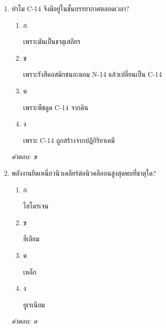 \documentclass[12pt]{article}
\begin{document}
\begin{enumerate}[label=\arabic*., itemsep=0.5\baselineskip, topsep=0.5\baselineskip, leftmargin=*]
\item ทำไม C-14 จึงมีอยู่ในชั้นบรรยากาศตลอดเวลา?
\begin{enumerate}[label=\alph*)., itemsep=0.3\baselineskip, topsep=0.3\baselineskip]
\item ก\ 
\begin{minipage}[t]{0.9\linewidth}
\raggedright เพราะมันเป็นธาตุเสถียร
\end{minipage}
\item ข\ 
\begin{minipage}[t]{0.9\linewidth}
\raggedright เพราะรังสีคอสมิกชนอะตอม N-14 แล้วเปลี่ยนเป็น C-14
\end{minipage}
\item ค\ 
\begin{minipage}[t]{0.9\linewidth}
\raggedright เพราะพืชดูด C-14 จากดิน
\end{minipage}
\item ง\ 
\begin{minipage}[t]{0.9\linewidth}
\raggedright เพราะ C-14 ถูกสร้างจากปฏิกิริยาเคมี
\end{minipage}
\end{enumerate}
\vspace{-0.3\baselineskip}
\begin{small}
\textit{คำตอบ: ข}
\end{small}

\item พลังงานยึดเหนี่ยวนิวเคลียร์ต่อนิวคลีออนสูงสุดพบที่ธาตุใด?
\begin{enumerate}[label=\alph*)., itemsep=0.3\baselineskip, topsep=0.3\baselineskip]
\item ก\ 
\begin{minipage}[t]{0.9\linewidth}
\raggedright ไฮโดรเจน
\end{minipage}
\item ข\ 
\begin{minipage}[t]{0.9\linewidth}
\raggedright ฮีเลียม
\end{minipage}
\item ค\ 
\begin{minipage}[t]{0.9\linewidth}
\raggedright เหล็ก
\end{minipage}
\item ง\ 
\begin{minipage}[t]{0.9\linewidth}
\raggedright ยูเรเนียม
\end{minipage}
\end{enumerate}
\vspace{-0.3\baselineskip}
\begin{small}
\textit{คำตอบ: ค}
\end{small}


\end{enumerate}
\end{document}
